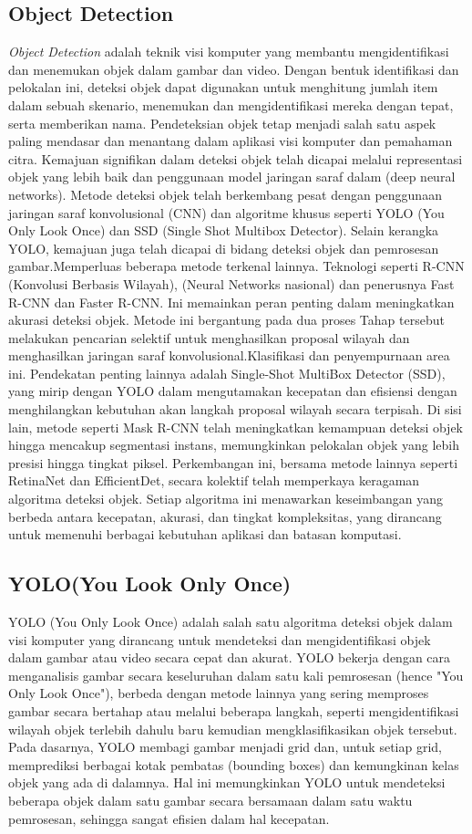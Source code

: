 \subsection{Object Detection}
\emph{Object Detection} adalah teknik visi komputer yang membantu mengidentifikasi dan menemukan objek dalam gambar dan video. Dengan bentuk identifikasi dan pelokalan ini, deteksi objek dapat digunakan untuk menghitung jumlah item dalam sebuah skenario, menemukan dan mengidentifikasi mereka dengan tepat, serta memberikan nama. Pendeteksian objek tetap menjadi salah satu aspek paling mendasar dan menantang dalam aplikasi visi komputer dan pemahaman citra. Kemajuan signifikan dalam deteksi objek telah dicapai melalui representasi objek yang lebih baik dan penggunaan model jaringan saraf dalam (deep neural networks). Metode deteksi objek telah berkembang pesat dengan penggunaan jaringan saraf konvolusional (CNN) dan algoritme khusus seperti YOLO (You Only Look Once) dan SSD (Single Shot Multibox Detector).
Selain kerangka YOLO, kemajuan juga telah dicapai di bidang deteksi objek dan pemrosesan gambar.Memperluas beberapa metode terkenal lainnya. Teknologi seperti R-CNN (Konvolusi Berbasis Wilayah), (Neural Networks nasional) dan penerusnya Fast R-CNN dan Faster R-CNN.
Ini memainkan peran penting dalam meningkatkan akurasi deteksi objek. Metode ini bergantung pada dua proses Tahap tersebut melakukan pencarian selektif untuk menghasilkan proposal wilayah dan menghasilkan jaringan saraf konvolusional.Klasifikasi dan penyempurnaan area ini. Pendekatan penting lainnya adalah Single-Shot MultiBox Detector (SSD), yang mirip dengan YOLO dalam mengutamakan kecepatan dan efisiensi dengan menghilangkan kebutuhan akan langkah proposal wilayah secara terpisah. Di sisi lain, metode seperti Mask R-CNN telah meningkatkan kemampuan deteksi objek hingga mencakup segmentasi instans, memungkinkan pelokalan objek yang lebih presisi hingga tingkat piksel. Perkembangan ini, bersama metode lainnya seperti RetinaNet dan EfficientDet, secara kolektif telah memperkaya keragaman algoritma deteksi objek. Setiap algoritma ini menawarkan keseimbangan yang berbeda antara kecepatan, akurasi, dan tingkat kompleksitas, yang dirancang untuk memenuhi berbagai kebutuhan aplikasi dan batasan komputasi.
\subsection{YOLO(You Look Only Once)}
    YOLO (You Only Look Once) adalah salah satu algoritma deteksi objek dalam visi komputer yang dirancang untuk mendeteksi dan mengidentifikasi objek dalam gambar atau video secara cepat dan akurat. YOLO bekerja dengan cara menganalisis gambar secara keseluruhan dalam satu kali pemrosesan (hence "You Only Look Once"), berbeda dengan metode lainnya yang sering memproses gambar secara bertahap atau melalui beberapa langkah, seperti mengidentifikasi wilayah objek terlebih dahulu baru kemudian mengklasifikasikan objek tersebut.
Pada dasarnya, YOLO membagi gambar menjadi grid dan, untuk setiap grid, memprediksi berbagai kotak pembatas (bounding boxes) dan kemungkinan kelas objek yang ada di dalamnya. Hal ini memungkinkan YOLO untuk mendeteksi beberapa objek dalam satu gambar secara bersamaan dalam satu waktu pemrosesan, sehingga sangat efisien dalam hal kecepatan.

